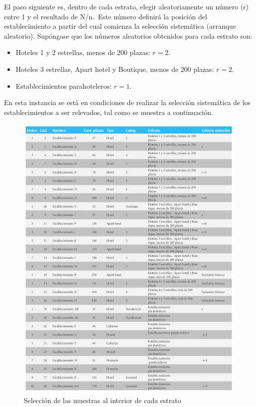 \documentclass[
]{book}
\begin{document}
El paso siguiente es, dentro de cada estrato, elegir aleatoriamente un número (r) entre 1 y el resultado de N/n.~Este número definirá la posición del establecimiento a partir del cual comienza la selección sistemática (arranque aleatorio). Supóngase que los números aleatorios obtenidos para cada estrato son:

\begin{itemize}
\item
  Hoteles 1 y 2 estrellas, menos de 200 plazas: \(r=2\).
\item
  Hoteles 3 estrellas, Apart hotel y Boutique, menos de 200 plazas: \(r=2\).
\item
  Establecimientos parahoteleros: \(r=1\).
\end{itemize}

En esta instancia se está en condiciones de realizar la selección sistemática de los establecimientos a ser relevados, tal como se muestra a continuación.

\begin{figure}

{\centering \includegraphics[width=0.8\linewidth]{imagenes/tabla_3} 

}

\caption{Selección de las muestras al interior de cada estrato}\label{fig:muestra-interior}
\end{figure}
\end{document}
